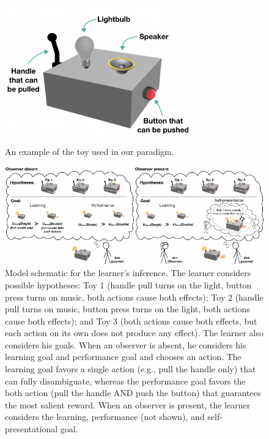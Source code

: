 \documentclass[10pt, letterpaper]{article}
\newenvironment{CodeChunk}{}{}
\begin{document}
\begin{CodeChunk}
\begin{figure}[b]

{\centering \includegraphics[width=0.65\linewidth]{figs/toy-1} 

}

\caption[An example of the toy used in our paradigm]{An example of the toy used in our paradigm.}\label{fig:toy}
\end{figure}
\end{CodeChunk}

\begin{CodeChunk}
\begin{figure}[tb]

{\centering \includegraphics[width=0.95\linewidth]{figs/model_diagram-1} 

}

\caption[Model schematic for the learner's inference]{Model schematic for the learner's inference. The learner considers possible hypotheses: Toy 1 (handle pull turns on the light, button press turns on music, both actions cause both effects); Toy 2 (handle pull turns on music, button press turns on the light, both actions cause both effects); and Toy 3 (both actions cause both effects, but each action on its own does not produce any effect). The learner also considers his goals. When an observer is absent, he considers his learning goal and performance goal and chooses an action. The learning goal favors a single action (e.g., pull the handle only) that can fully disambiguate, whereas the performance goal favors the both action (pull the handle AND push the button) that guarantees the most salient reward. When an observer is present, the learner considers the learning, performance (not shown), and self-presentational goal.}\label{fig:model_diagram}
\end{figure}
\end{CodeChunk}
\end{document}
